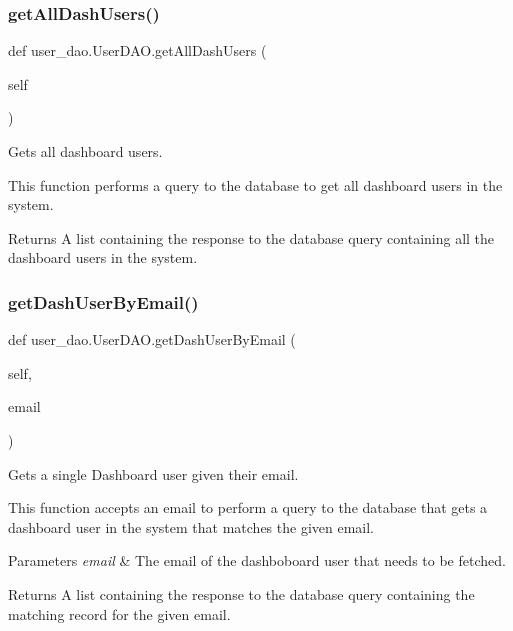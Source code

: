 \subsubsection{\texorpdfstring{get\+All\+Dash\+Users()}{getAllDashUsers()}}
{\footnotesize\ttfamily def user\+\_\+dao.\+User\+D\+A\+O.\+get\+All\+Dash\+Users (\begin{DoxyParamCaption}\item[{}]{self }\end{DoxyParamCaption})}



Gets all dashboard users. 

This function performs a query to the database to get all dashboard users in the system.

\begin{DoxyReturn}{Returns}
A list containing the response to the database query containing all the dashboard users in the system. 
\end{DoxyReturn}
\mbox{\label{classuser__dao_1_1_user_d_a_o_a0ba6ba2b47d276250b1fbe7c8879b31b}} 
\subsubsection{\texorpdfstring{get\+Dash\+User\+By\+Email()}{getDashUserByEmail()}}
{\footnotesize\ttfamily def user\+\_\+dao.\+User\+D\+A\+O.\+get\+Dash\+User\+By\+Email (\begin{DoxyParamCaption}\item[{}]{self,  }\item[{}]{email }\end{DoxyParamCaption})}



Gets a single Dashboard user given their email. 

This function accepts an email to perform a query to the database that gets a dashboard user in the system that matches the given email.


\begin{DoxyParams}{Parameters}
{\em email} & The email of the dashboboard user that needs to be fetched.\\
\hline
\end{DoxyParams}
\begin{DoxyReturn}{Returns}
A list containing the response to the database query containing the matching record for the given email. 
\end{DoxyReturn}
\mbox{\label{classuser__dao_1_1_user_d_a_o_abbf8f6a400b633f33458b768db09c60d}} 
